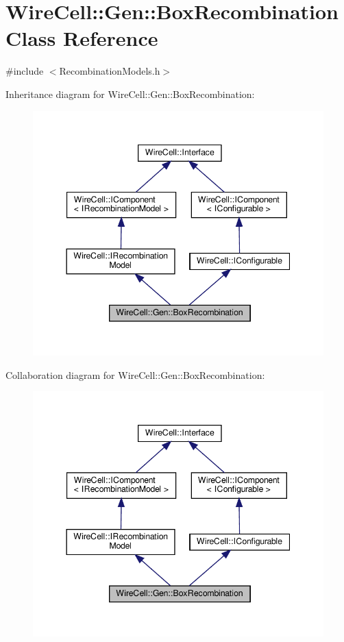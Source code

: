 \hypertarget{class_wire_cell_1_1_gen_1_1_box_recombination}{}\section{Wire\+Cell\+:\+:Gen\+:\+:Box\+Recombination Class Reference}
\label{class_wire_cell_1_1_gen_1_1_box_recombination}


{\ttfamily \#include $<$Recombination\+Models.\+h$>$}



Inheritance diagram for Wire\+Cell\+:\+:Gen\+:\+:Box\+Recombination\+:
\nopagebreak
\begin{figure}[H]
\begin{center}
\leavevmode
\includegraphics[width=344pt]{class_wire_cell_1_1_gen_1_1_box_recombination__inherit__graph}
\end{center}
\end{figure}


Collaboration diagram for Wire\+Cell\+:\+:Gen\+:\+:Box\+Recombination\+:
\nopagebreak
\begin{figure}[H]
\begin{center}
\leavevmode
\includegraphics[width=344pt]{class_wire_cell_1_1_gen_1_1_box_recombination__coll__graph}
\end{center}
\end{figure}
